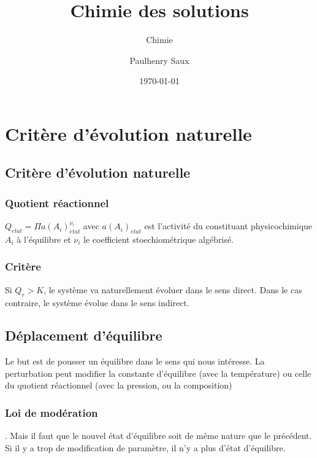 \documentclass[french]{yLectureNote}
\title{Chimie des solutions}
\subtitle{Chimie}
\author{Paulhenry Saux}
\date{\today}
\begin{document}
\setcounter{chapter}{1}
	\chapter{Critère d'évolution naturelle}
\section{Critère d'évolution naturelle}
\subsection{Quotient réactionnel}
\begin{definition}
\(Q_{etat} = \Pi a(A_i)_{etat}^{\nu_i}\) avec $a(A_i)_{etat}$ est l'activité du constituant physicochimique $A_i$ à l'équilibre et $\nu_i$ le coefficient stoechiométrique algébrisé.
\end{definition}
\subsection{Critère}
Si $Q_r > K$, le système va naturellement évoluer dans le sens direct. Dans le cas contraire, le système évolue dans le sens indirect. 
\section{Déplacement d'équilibre}
Le but est de pousser un équilibre dans le sens qui nous intéresse. La perturbation peut modifier la constante d'équilibre (avec la température) ou celle du quotient réactionnel (avec la pression, ou la composition)
\subsection{Loi de modération}
. Mais il faut que le nouvel état d'équilibre soit de m\^eme nature que le précédent. Si il y a trop de modification de paramètre, il n'y a plus d'état d'équilibre.
\end{document}
